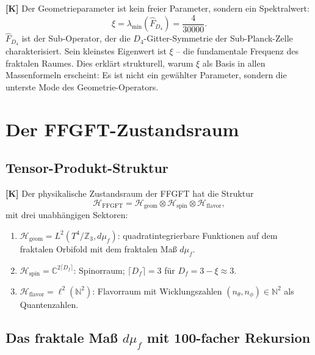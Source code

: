\textbf{[K]} Der Geometrieparameter ist kein freier Parameter, sondern
ein Spektralwert:
\begin{equation}
  \xi = \lambda_{\min}(\hat{F}_{D_4}) = \frac{4}{30000}.
  \label{eq:xi_eigen}
\end{equation}
$\hat{F}_{D_4}$ ist der Sub-Operator, der die $D_4$-Gitter-Symmetrie
der Sub-Planck-Zelle charakterisiert. Sein kleinstes Eigenwert ist
$\xi$ -- die fundamentale Frequenz des fraktalen Raumes. Dies erklärt
strukturell, warum $\xi$ als Basis in allen Massenformeln erscheint:
Es ist nicht ein gewählter Parameter, sondern die unterste Mode des
Geometrie-Operators.

\section{Der FFGFT-Zustandsraum}

\subsection{Tensor-Produkt-Struktur}

\textbf{[K]} Der physikalische Zustandsraum der FFGFT hat die Struktur
\begin{equation}
  \mathcal{H}_{\mathrm{FFGFT}}
  = \mathcal{H}_{\mathrm{geom}}
  \otimes \mathcal{H}_{\mathrm{spin}}
  \otimes \mathcal{H}_{\mathrm{flavor}},
  \label{eq:Htensor}
\end{equation}
mit drei unabhängigen Sektoren:

\begin{enumerate}
  \item $\mathcal{H}_{\mathrm{geom}} = L^2(T^4/\mathbb{Z}_3, d\mu_f)$:
    quadratintegrierbare Funktionen auf dem fraktalen Orbifold mit
    dem fraktalen Maß $d\mu_f$.
  \item $\mathcal{H}_{\mathrm{spin}} = \mathbb{C}^{2\lceil D_f\rceil}$:
    Spinorraum; $\lceil D_f \rceil = 3$ für $D_f = 3 - \xi \approx 3$.
  \item $\mathcal{H}_{\mathrm{flavor}} = \ell^2(\mathbb{N}^2)$:
    Flavorraum mit Wicklungszahlen $(n_\theta, n_\phi) \in \mathbb{N}^2$
    als Quantenzahlen.
\end{enumerate}

\subsection{Das fraktale Maß $d\mu_f$ mit 100-facher Rekursion}

